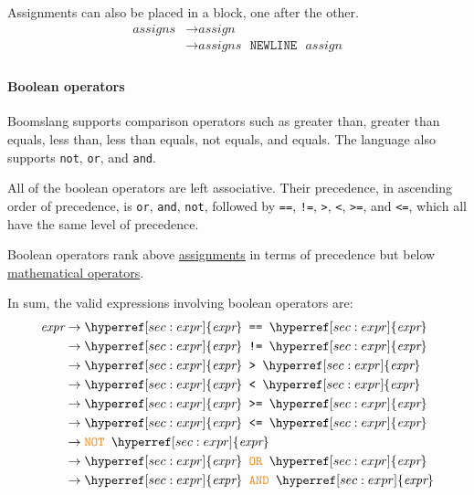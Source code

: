 \documentclass{article}
\begin{document}
Assignments can also be placed in a block, one after the other.
\label{sec:assigns}
\begin{align*}
    \textit{assigns} &\to \hyperref[sec:assign]{\textit{assign}} \\
    &\to \hyperref[sec:assigns]{\textit{assigns}} \texttt{ } \texttt{NEWLINE} \texttt{ } \hyperref[sec:assign]{\textit{assign}} \\
\end{align*}

\paragraph{Boolean operators}
\label{sec:expr-boolean-operators}
Boomslang supports comparison operators such as greater than, greater than equals, less than, less than equals, not equals, and equals. The language also supports \texttt{not}, \texttt{or}, and \texttt{and}.

All of the boolean operators are left associative. Their precedence, in ascending order of precedence, is \texttt{or}, \texttt{and}, \texttt{not}, followed by \texttt{==}, \texttt{!=}, \texttt{>}, \texttt{<}, \texttt{>=}, and \texttt{<=}, which all have the same level of precedence.

Boolean operators rank above \hyperref[sec:assigns]{assignments} in terms of precedence but below \hyperref[sec:expr-mathematical-operators]{mathematical operators}.

In sum, the valid expressions involving boolean operators are:
\begin{align*}
    \textit{expr} &\to \hyperref[sec:expr]{\textit{expr}} \texttt{ == } \hyperref[sec:expr]{\textit{expr}} \\
    &\to \hyperref[sec:expr]{\textit{expr}} \texttt{ != } \hyperref[sec:expr]{\textit{expr}} \\
    &\to \hyperref[sec:expr]{\textit{expr}} \texttt{ > } \hyperref[sec:expr]{\textit{expr}} \\
    &\to \hyperref[sec:expr]{\textit{expr}} \texttt{ < } \hyperref[sec:expr]{\textit{expr}} \\
    &\to \hyperref[sec:expr]{\textit{expr}} \texttt{ >= } \hyperref[sec:expr]{\textit{expr}} \\
    &\to \hyperref[sec:expr]{\textit{expr}} \texttt{ <= } \hyperref[sec:expr]{\textit{expr}} \\
    &\to \textcolor{orange}{\texttt{NOT}} \texttt{ } \hyperref[sec:expr]{\textit{expr}} \\
    &\to \hyperref[sec:expr]{\textit{expr}} \textcolor{orange}{\texttt{ OR }} \hyperref[sec:expr]{\textit{expr}} \\
    &\to \hyperref[sec:expr]{\textit{expr}} \textcolor{orange}{\texttt{ AND }} \hyperref[sec:expr]{\textit{expr}} \\
\end{align*}
\end{document}
